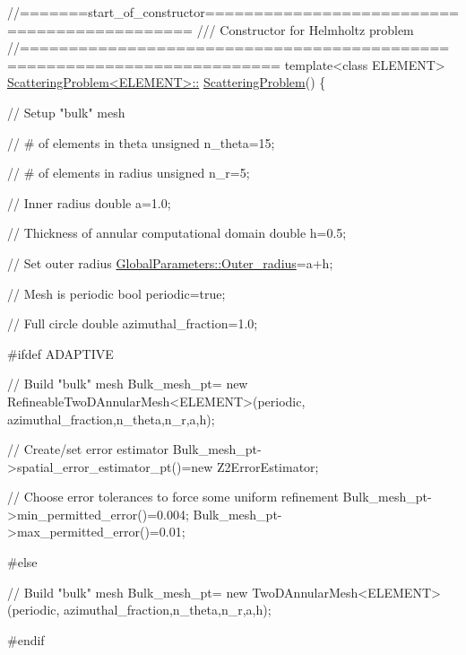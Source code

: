  
\begin{DoxyCodeInclude}
\textcolor{comment}{//=======start\_of\_constructor=============================================}
\textcolor{comment}{/// Constructor for Helmholtz problem}
\textcolor{comment}{}\textcolor{comment}{//========================================================================}
\textcolor{keyword}{template}<\textcolor{keyword}{class} ELEMENT>
\hyperlink{classScatteringProblem_a94710f5d2ee52abc3df9dc8d1fd3eb71}{ScatteringProblem<ELEMENT>::}
\hyperlink{classScatteringProblem_a94710f5d2ee52abc3df9dc8d1fd3eb71}{ScatteringProblem}()
\{ 
 
 \textcolor{comment}{// Setup "bulk" mesh}
 
 \textcolor{comment}{// # of elements in theta}
 \textcolor{keywordtype}{unsigned} n\_theta=15;
 
 \textcolor{comment}{// # of elements in radius}
 \textcolor{keywordtype}{unsigned} n\_r=5;
 
 \textcolor{comment}{// Inner radius}
 \textcolor{keywordtype}{double} a=1.0;
 
 \textcolor{comment}{// Thickness of annular computational domain}
 \textcolor{keywordtype}{double} h=0.5; 

 \textcolor{comment}{// Set outer radius}
 \hyperlink{namespaceGlobalParameters_a61b086072a6b8fd38af1a85f1dd1674a}{GlobalParameters::Outer\_radius}=a+h;

 \textcolor{comment}{// Mesh is periodic}
 \textcolor{keywordtype}{bool} periodic=\textcolor{keyword}{true}; 
 
 \textcolor{comment}{// Full circle}
 \textcolor{keywordtype}{double} azimuthal\_fraction=1.0;

\textcolor{preprocessor}{#ifdef ADAPTIVE}
 
 \textcolor{comment}{// Build "bulk" mesh}
 Bulk\_mesh\_pt=
  \textcolor{keyword}{new} RefineableTwoDAnnularMesh<ELEMENT>(periodic,
                                         azimuthal\_fraction,n\_theta,n\_r,a,h);
 
 \textcolor{comment}{// Create/set error estimator}
 Bulk\_mesh\_pt->spatial\_error\_estimator\_pt()=\textcolor{keyword}{new} Z2ErrorEstimator;
 
 \textcolor{comment}{// Choose error tolerances to force some uniform refinement}
 Bulk\_mesh\_pt->min\_permitted\_error()=0.004;
 Bulk\_mesh\_pt->max\_permitted\_error()=0.01;

\textcolor{preprocessor}{#else}
 
 \textcolor{comment}{// Build "bulk" mesh}
 Bulk\_mesh\_pt=
  \textcolor{keyword}{new} TwoDAnnularMesh<ELEMENT>(periodic,
                               azimuthal\_fraction,n\_theta,n\_r,a,h);
 
\textcolor{preprocessor}{#endif}

\end{DoxyCodeInclude}


